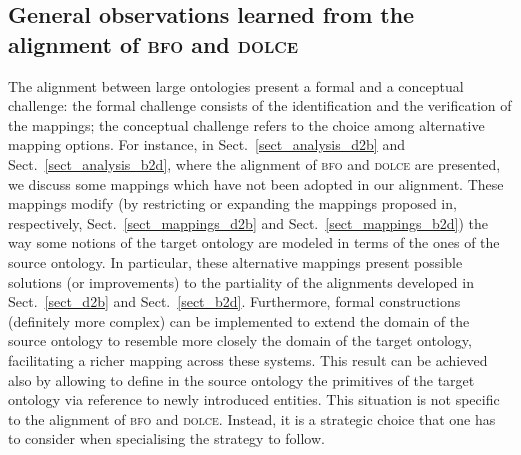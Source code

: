 \documentclass[ao]{iosart2x}
\newcommand{\nb}[1]{\textcolor{red}{$|$}\marginpar{\hspace*{-0cm}\parbox{20mm}{\scriptsize\raggedright\textcolor{red}{#1}}}}
\newcommand{\pr}[1]{\mathtt{#1}}
\newcommand{\prbfo}[1]{{\textit{{#1}}}}
\newcommand{\cn}[1]{\mathtt{#1}}
\newcommand{\dolce}{{\textsc{dolce}}}
\newcommand{\bfo}{{\textsc{bfo}}}
\newcommand {\EDdcat} {\textsc{ed}}
\newcommand {\PDdcat} {\textsc{pd}}
\newcommand {\TPd} {\ensuremath{\pr{tP}}}
\newcommand {\Pd} {\ensuremath{\pr{P}}}
\newcommand{\cntbcat}{\cn{cnt}}
\newcommand{\occbcat}{\cn{occ}}
\newcommand{\bfocpart}{\prbfo{cP}}
\newcommand{\bfoopart}{\prbfo{oP}}
\begin{document}
\subsection{General observations learned from the alignment of {\bfo} and {\dolce}}
The alignment between large ontologies present a formal and a conceptual challenge: the formal challenge consists of the identification and the verification of the mappings; the conceptual challenge refers to the choice among alternative mapping options.
For instance, in Sect.~\ref{sect_analysis_d2b} and Sect.~\ref{sect_analysis_b2d}, where the alignment of {\bfo} and {\dolce} are presented, we discuss some mappings which have not been adopted in our alignment. These mappings modify (by restricting or expanding the mappings proposed in, respectively, Sect.~\ref{sect_mappings_d2b} and Sect.~\ref{sect_mappings_b2d}) the way some notions of the target ontology are modeled in terms of the ones of the source ontology. 
In particular, these alternative mappings present possible solutions (or improvements) to the partiality of the alignments developed in Sect.~\ref{sect_d2b} and Sect.~\ref{sect_b2d}. Furthermore, formal constructions (definitely more complex) can be implemented to extend the domain of the source ontology to resemble more closely the domain of the target ontology, facilitating a richer mapping across these systems. This result can be achieved also by allowing to define in the source ontology the primitives of the target ontology via reference to newly introduced entities. This situation is not specific to the alignment of {\bfo} and {\dolce}. Instead, it is a strategic choice that one has to consider when specialising the strategy to follow.
 
\end{document}
